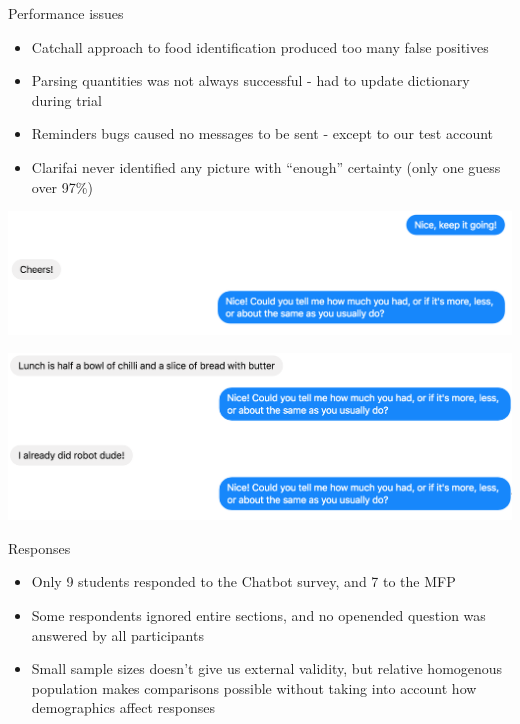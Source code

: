 \documentclass[landscape]{infslides}
\begin{document}
\begin{slide}{Performance issues}
    \begin{itemize}
        \item Catchall approach to food identification produced too many false positives
        \item Parsing quantities was not always successful - had to update dictionary during trial
        \item Reminders bugs caused no messages to be sent - except to our test account
        \item Clarifai never identified any picture with ``enough'' certainty (only one guess over 97\%)
    \end{itemize}
\end{slide}
\begin{slide}{}
    \includegraphics[width=\textwidth]{Nice7.png}

    \includegraphics[width=\textwidth]{Nice2.png}
\end{slide}
\begin{slide}{Responses}
    \begin{itemize}
        \item Only 9 students responded to the Chatbot survey, and 7 to the MFP
        \item Some respondents ignored entire sections, and no openended question was answered by all participants
        \item Small sample sizes doesn't give us external validity, but relative homogenous population makes comparisons possible without taking into account how demographics affect responses
    \end{itemize}
\end{slide}
\end{document}

